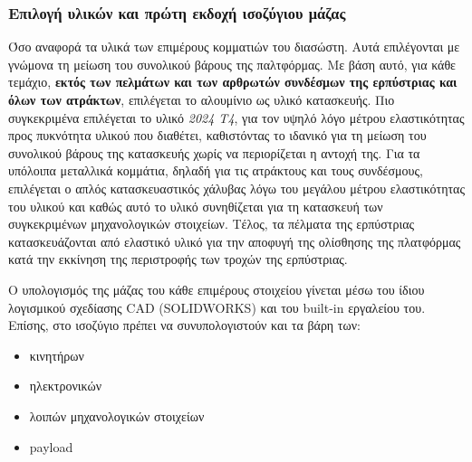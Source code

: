 \subsubsection{Επιλογή υλικών και πρώτη εκδοχή ισοζύγιου μάζας}
Όσο αναφορά τα υλικά των επιμέρους κομματιών του διασώστη. Αυτά επιλέγονται με γνώμονα τη μείωση του συνολικού βάρους της παλτφόρμας. Με βάση αυτό, για κάθε τεμάχιο, \textbf{εκτός των πελμάτων και των αρθρωτών συνδέσμων της ερπύστριας και όλων των ατράκτων}, επιλέγεται το αλουμίνιο ως υλικό κατασκευής. Πιο συγκεκριμένα επιλέγεται το υλικό \textit{2024 T4}, για τον υψηλό λόγο μέτρου ελαστικότητας προς πυκνότητα υλικού που διαθέτει, καθιστόντας το ιδανικό για τη μείωση του συνολικού βάρους της κατασκευής χωρίς να περιορίζεται η αντοχή της. Για τα υπόλοιπα μεταλλικά κομμάτια, δηλαδή για τις ατράκτους και τους συνδέσμους, επιλέγεται ο απλός κατασκευαστικός χάλυβας λόγω του μεγάλου μέτρου ελαστικότητας του υλικού και καθώς αυτό το υλικό συνηθίζεται για τη κατασκευή των συγκεκριμένων μηχανολογικών στοιχείων. Τέλος, τα πέλματα της ερπύστριας κατασκευάζονται από ελαστικό υλικό για την αποφυγή της ολίσθησης της πλατφόρμας κατά την εκκίνηση της περιστροφής των τροχών της ερπύστριας.
\par Ο υπολογισμός της μάζας του κάθε επιμέρους στοιχείου γίνεται μέσω του ίδιου λογισμικού σχεδίασης CAD (SOLIDWORKS) και του built-in εργαλείου του. Επίσης, στο ισοζύγιο πρέπει να συνυπολογιστούν και τα βάρη των:
\begin{itemize}
    \item κινητήρων
    \item ηλεκτρονικών
    \item λοιπών μηχανολογικών στοιχείων
    \item payload
\end{itemize}

